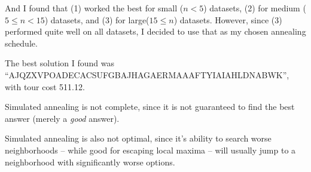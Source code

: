 \documentclass[12pt]{article}
\begin{document}
And I found that (1) worked the best for small ($n < 5$) datasets, (2) for medium ($5 \leq n < 15$) datasets, and (3)
for large($15 \leq n$) datasets. However, since (3) performed quite well on all datasets, I decided to use that as my
chosen annealing schedule.

\newpage
\problemasub
{}
The best solution I found was ``AJQZXVPOADECACSUFGBAJHAGAERMAAAFTYIAIAHLDNABWK'', with tour cost 511.12.

\problemasub
Simulated annealing is not complete, since it is not guaranteed to find the best answer (merely a \textit{good} answer).

\problemasub
Simulated annealing is also not optimal, since it's ability to search worse neighborhoods -- while good for escaping
local maxima -- will usually jump to a neighborhood with significantly worse options.
\end{document}

